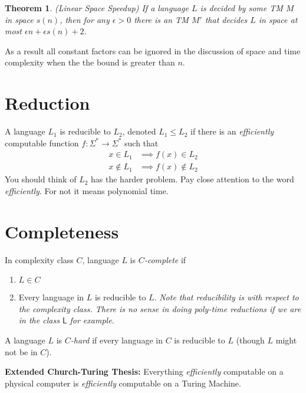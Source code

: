 \documentclass[twoside]{article}
\newcounter{lecnum}
\newtheorem{theorem}{Theorem}[lecnum]
\begin{document}
\begin{theorem}
(Linear Space Speedup) If a language $L$ is decided by some TM $M$ in space $s(n)$, then for any $\epsilon > 0$ there is an TM $M'$ that decides $L$ in space at most $\epsilon n + \epsilon s(n) + 2$. 
\end{theorem}

As a result all constant factors can be ignored in the discussion of space and time complexity when the the bound is greater than $n$.

\section{Reduction}
A language $L_1$ is reducible to $L_2$, denoted $L_1 \leq L_2$ if there is an \emph{efficiently} computable function $f: \Sigma^* \rightarrow \Sigma^*$ such that 
\begin{align*}
x \in L_1 &\implies f(x) \in L_2 \\
x \notin L_1 &\implies f(x) \notin L_2
\end{align*}
You should think of $L_2$ has the harder problem. Pay close attention to the word \emph{efficiently}. For not it means polynomial time.

\section{Completeness}
In complexity class $C$, language $L$ is \emph{$C$-complete} if
\begin{enumerate}
\item $L \in C$
\item Every language in $L$ is reducible to $L$. \emph{Note that reducibility is with respect to the complexity class. There is no sense in doing poly-time reductions if we are in the class $\mathsf{L}$ for example.} 
\end{enumerate}
A language $L$ is \emph{$C$-hard} if every language in $C$ is reducible to $L$ (though $L$ might not be in $C$). 

\textbf{Extended Church-Turing Thesis:} Everything \emph{efficiently} computable on a physical computer is \emph{efficiently} computable on a Turing Machine.

\begin{comment}
\section{Diagonalization}
Yeah, it is kind of weird to have a full chapter devoted to this, but it is an important tool for separating complexity classes. In essence one needs to exhibit a machine in one class that gives a different answer on some input from \emph{every} machine in another class. Use this tool to prove \emph{hierarchy theorems}.
\end{comment}
\end{document}
